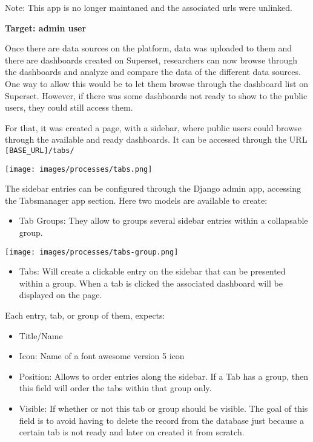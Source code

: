 \documentclass[
]{book}
\providecommand{\tightlist}{%
  \setlength{\itemsep}{0pt}\setlength{\parskip}{0pt}}
\begin{document}
Note: This app is no longer maintaned and the associated urls were unlinked.

\textbf{Target: admin user}

Once there are data sources on the platform, data was uploaded to them and there are dashboards created on Superset, researchers can now browse through the dashboards and analyze and compare the data of the different data sources.
One way to allow this would be to let them browse through the dashboard list on Superset. However, if there was some dashboards not ready to show to the public users, they could still access them.

For that, it was created a page, with a sidebar, where public users could browse through the available and ready dashboards.
It can be accessed through the URL \texttt{{[}BASE\_URL{]}/tabs/}

\texttt{[image: images/processes/tabs.png]}

The sidebar entries can be configured through the Django admin app, accessing the Tabsmanager app section.
Here two models are available to create:

\begin{itemize}
\tightlist
\item
  Tab Groups: They allow to groups several sidebar entries within a collapsable group.
\end{itemize}

\texttt{[image: images/processes/tabs-group.png]}

\begin{itemize}
\tightlist
\item
  Tabs: Will create a clickable entry on the sidebar that can be presented within a group. When a tab is clicked the associated dashboard will be displayed on the page.
\end{itemize}

Each entry, tab, or group of them, expects:

\begin{itemize}
\tightlist
\item
  Title/Name
\item
  Icon: Name of a font awesome version 5 icon
\item
  Position: Allows to order entries along the sidebar. If a Tab has a group, then this field will order the tabs within that group only.
\item
  Visible: If whether or not this tab or group should be visible. The goal of this field is to avoid having to delete the record from the database just because a certain tab is not ready and later on created it from scratch.
\end{itemize}
\end{document}
